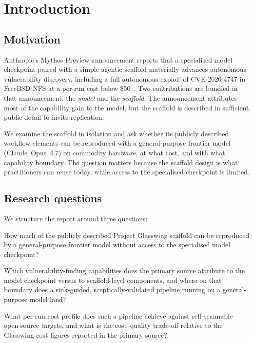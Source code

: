 \documentclass[11pt,a4paper]{article}
\begin{document}
\tableofcontents
\vspace{0.6em}

\section{Introduction}
\label{sec:intro}

\subsection{Motivation}
\label{sec:motivation}

Anthropic's Mythos Preview announcement reports that a specialised model
checkpoint paired with a simple agentic scaffold materially advances
autonomous vulnerability discovery, including a full autonomous exploit of
CVE-2026-4747 in FreeBSD NFS at a per-run cost below
\$50~\citep{anthropicMythos2026,nvd20264747}. Two contributions are bundled
in that announcement: the \emph{model} and the \emph{scaffold}. The
announcement attributes most of the capability gain to the model, but the
scaffold is described in sufficient public detail to invite replication.

We examine the scaffold in isolation and ask whether its publicly described
workflow elements can be reproduced with a general-purpose frontier model
(Claude~Opus~4.7) on commodity hardware, at what cost, and with what
capability boundary. The question matters because the scaffold design is
what practitioners can reuse today, while access to the specialised
checkpoint is limited.

\subsection{Research questions}
\label{sec:rqs}

We structure the report around three questions:

\begin{description}[leftmargin=20pt,style=nextline,font=\normalfont\itshape]
  \item[RQ1.] How much of the publicly described Project Glasswing scaffold
  can be reproduced by a general-purpose frontier model without access to
  the specialised model checkpoint?
  \item[RQ2.] Which vulnerability-finding capabilities does the primary
  source attribute to the model checkpoint versus to scaffold-level
  components, and where on that boundary does a sink-guided,
  sceptically-validated pipeline running on a general-purpose model land?
  \item[RQ3.] What per-run cost profile does such a pipeline achieve against
  self-scannable open-source targets, and what is the cost--quality
  trade-off relative to the Glasswing cost figures reported in the primary
  source?
\end{description}
\end{document}
